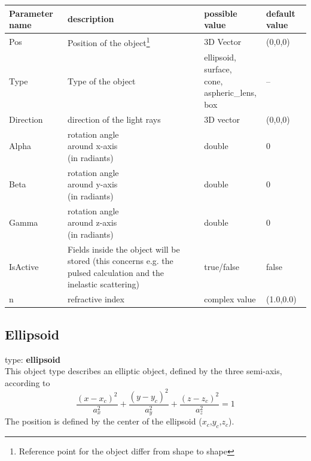 \documentclass[a4paper,html,11pt,openany]{book}
\begin{document}
 \vspace{1em}
 \begin{longtable}{p{2cm}|m{3.5cm}|m{3.0cm}|p{1.7cm}}
 Parameter name & description  & possible value & default value\\
 \hline
  Pos & Position of the object\footnote{Reference point for the object differ from shape to shape} & 3D Vector & (0,0,0) \\
  \hline
  Type & Type of the object  & \parbox{3cm}{ellipsoid,\\surface,\\cone,\\aspheric\_lens,\\box} & --  \\
  \hline 
  Direction & direction of the light rays & 3D vector & (0,0,0) \\
  \hline
  Alpha & \parbox{3.5cm}{rotation angle\\around x-axis\\(in radiants)} & double & 0 \\ 
    \hline
  Beta & \parbox{3.5cm}{rotation angle\\around y-axis\\(in radiants)} & double & 0 \\ 
      \hline
  Gamma & \parbox{3.5cm}{rotation angle\\around z-axis\\(in radiants)} & double & 0 \\ 
  \hline
  IsActive & \parbox{3.5cm}{Fields inside the object will be stored (this concerns e.g. the pulsed calculation and the inelastic scattering)} & true/false & false \\
  \hline
  n & refractive index & complex value & (1.0,0.0) 
\end{longtable} 
  
\subsection{Ellipsoid}
 type: \textbf {ellipsoid} \\
 This object type describes an elliptic object, defined by the three semi-axis, according to
  \begin{equation}
  \frac{(x-x_c)^2}{a_x^2}+\frac{(y-y_c)^2}{a_y^2}+\frac{(z-z_c)^2}{a_z^2}=1
\end{equation}   
The position is defined by the center of the ellipsoid ($x_c$,$y_c$,$z_c$).
\end{document}
